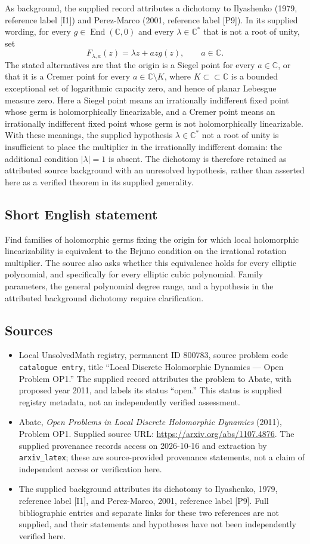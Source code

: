 \documentclass[11pt]{article}
\newcommand{\C}{\mathbb{C}}
\begin{document}
As background, the supplied record attributes a dichotomy to Ilyashenko (1979, reference label [I1]) and Perez-Marco (2001, reference label [P9]). In its supplied wording, for every \(g\in\operatorname{End}(\C,0)\) and every \(\lambda\in\C^*\) that is not a root of unity, set
\[
F_{\lambda,a}(z)=\lambda z+azg(z),\qquad a\in\C.
\]
The stated alternatives are that the origin is a Siegel point for every \(a\in\C\), or that it is a Cremer point for every \(a\in\C\setminus K\), where \(K\subset\subset\C\) is a bounded exceptional set of logarithmic capacity zero, and hence of planar Lebesgue measure zero. Here a Siegel point means an irrationally indifferent fixed point whose germ is holomorphically linearizable, and a Cremer point means an irrationally indifferent fixed point whose germ is not holomorphically linearizable. With these meanings, the supplied hypothesis \(\lambda\in\C^*\) not a root of unity is insufficient to place the multiplier in the irrationally indifferent domain: the additional condition \(|\lambda|=1\) is absent. The dichotomy is therefore retained as attributed source background with an unresolved hypothesis, rather than asserted here as a verified theorem in its supplied generality.
\subsection{Short English statement}
Find families of holomorphic germs fixing the origin for which local holomorphic linearizability is equivalent to the Brjuno condition on the irrational rotation multiplier. The source also asks whether this equivalence holds for every elliptic polynomial, and specifically for every elliptic cubic polynomial. Family parameters, the general polynomial degree range, and a hypothesis in the attributed background dichotomy require clarification.
\subsection{Sources}
\begin{itemize}
\item Local UnsolvedMath registry, permanent ID \(800783\), source problem code \texttt{catalogue entry}, title ``Local Discrete Holomorphic Dynamics --- Open Problem OP1.'' The supplied record attributes the problem to Abate, with proposed year 2011, and labels its status ``open.'' This status is supplied registry metadata, not an independently verified assessment.
\item Abate, \emph{Open Problems in Local Discrete Holomorphic Dynamics} (2011), Problem OP1. Supplied source URL: \url{https://arxiv.org/abs/1107.4876}. The supplied provenance records access on 2026-10-16 and extraction by \texttt{arxiv\_latex}; these are source-provided provenance statements, not a claim of independent access or verification here.
\item The supplied background attributes its dichotomy to Ilyashenko, 1979, reference label [I1], and Perez-Marco, 2001, reference label [P9]. Full bibliographic entries and separate links for these two references are not supplied, and their statements and hypotheses have not been independently verified here.
\end{itemize}
\end{document}
